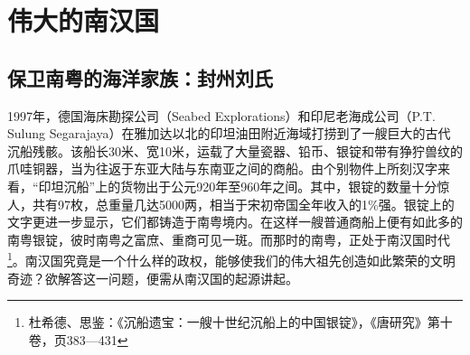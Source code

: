 \chapter{伟大的南汉国}

\section{保卫南粤的海洋家族：封州刘氏}

\indent 1997年，德国海床勘探公司（Seabed Explorations）和印尼老海成公司（P.T. Sulung Segarajaya）在雅加达以北的印坦油田附近海域打捞到了一艘巨大的古代沉船残骸。该船长30米、宽10米，运载了大量瓷器、铅币、银锭和带有狰狞兽纹的爪哇铜器，当为往返于东亚大陆与东南亚之间的商船。由个别物件上所刻汉字来看，“印坦沉船”上的货物出于公元920年至960年之间。其中，银锭的数量十分惊人，共有97枚，总重量几达5000两，相当于宋初帝国全年收入的1\%强。银锭上的文字更进一步显示，它们都铸造于南粤境内。在这样一艘普通商船上便有如此多的南粤银锭，彼时南粤之富庶、重商可见一斑。而那时的南粤，正处于南汉国时代\footnote{杜希德、思鉴：《沉船遗宝：一艘十世纪沉船上的中国银锭》，《唐研究》第十卷，页383—431}。南汉国究竟是一个什么样的政权，能够使我们的伟大祖先创造如此繁荣的文明奇迹？欲解答这一问题，便需从南汉国的起源讲起。


